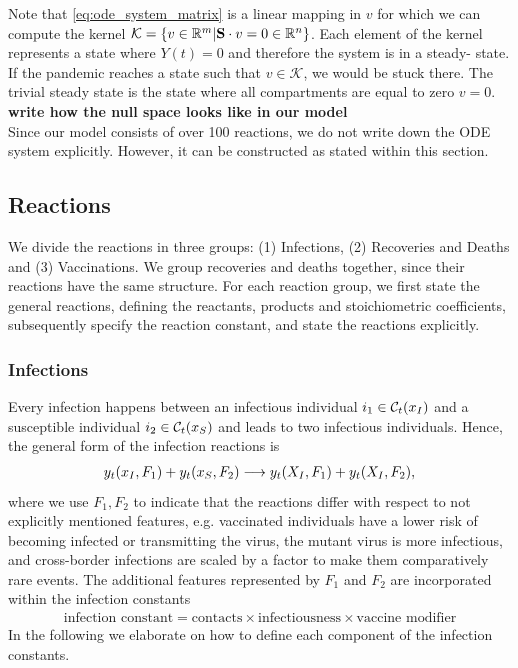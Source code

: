 Note that \eqref{eq:ode_system_matrix} is a linear mapping in $v$ for which we can compute the kernel $\mathcal{K}=\left\{v \in \mathbb{R}^m | \mathbf{S} \cdot v = 0 \in \mathbb{R}^n  \right\}$. Each element of the kernel represents a state where $Y(t)=0$ and therefore the system is in a steady- state. If the pandemic reaches a state such that $v \in \mathcal{K}$, we would be stuck there. The trivial steady state is the state where all compartments are equal to zero $v=0$. \textbf{write how the null space looks like in our model} \\

Since our model consists of over 100 reactions, we do not write down the ODE system explicitly. However, it can be constructed as stated within this section.  
\subsection{Reactions}
We divide the reactions in three groups: (1) Infections, (2) Recoveries and Deaths and (3) Vaccinations. We group recoveries and deaths together, since their reactions have the same structure. For each reaction group, we first state the general reactions, defining the reactants, products and stoichiometric coefficients, subsequently specify the reaction constant, and state the reactions explicitly.


\subsubsection{Infections}
Every infection happens between an infectious individual $i_1 \in \mathcal{C}_t(x_I)$ and a susceptible individual $i_2 \in \mathcal{C}_t(x_S)$ and leads to two infectious individuals. Hence, the general form of the infection reactions is
\begin{align}
\label{eq:general_infection}
y_t(x_I, F_1) + y_t(x_S, F_2) \longrightarrow y_t(X_I, F_1) + y_t(X_I, F_2),
\end{align}
where we use $F_1, F_2$ to indicate that the reactions differ with respect to not explicitly mentioned features, e.g. vaccinated individuals have a lower risk of becoming infected or transmitting the virus, the mutant virus is more infectious, and cross-border infections are scaled by a factor to make them comparatively rare events. %
The additional features represented by $F_1$ and $F_2$ are incorporated within the infection constants
\begin{align*}
\text{infection constant} = \text{contacts} \times \text{infectiousness} \times \text{vaccine modifier} 
\end{align*}
In the following we elaborate on how to define each component of the infection constants.\\

